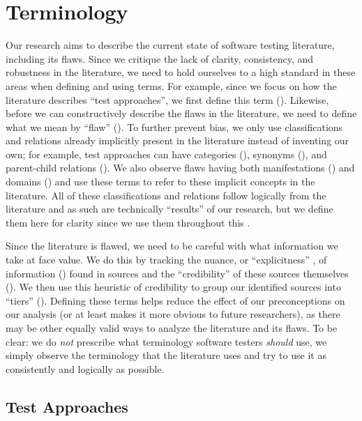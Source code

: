\section{Terminology}\label{terminology}

Our research aims to describe the current state of software testing literature,
including its flaws. Since we critique the lack of clarity, consistency, and
robustness in the literature, we need to hold ourselves to a high standard in
these areas when defining and using terms. For example, since we focus
on how the literature describes ``test approaches'', we first define this term
(). Likewise, before we can constructively describe
the flaws in the literature, we need to define what we mean by ``flaw''
(). To further prevent bias, we only use classifications and
relations already implicitly present in the literature instead of
inventing our own; for example, test approaches can have categories
(), synonyms (), and parent-child relations
(). We also observe flaws having both manifestations
() and domains () and use %
these terms to refer to these implicit concepts in the literature. All of these
classifications and relations follow logically from the literature and as such
are technically ``results'' of our research, but we define them here for
clarity since we use them throughout this \docType{}.

Since the literature is flawed, we need to be careful with what information we
take at face value. We do this by tracking the nuance, or ``explicitness''%
, of information () found in sources and
the ``credibility'' of these sources themselves (). We then use this
heuristic of credibility to group our identified sources into ``tiers''
(). Defining these terms helps reduce the effect of our
preconceptions on our analysis (or at least makes it more obvious to future
researchers), as there may be other equally valid ways to analyze the
literature and its flaws. To be clear: we do \emph{not} prescribe what
terminology software testers \emph{should} use, we simply observe the
terminology that the literature uses and try to use it as consistently and
logically as possible.

\ifnotpaper\newpage\fi
\subsection{Test Approaches}\label{approach-def}

